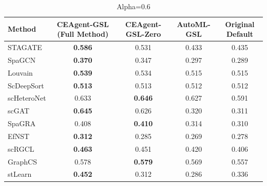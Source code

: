 \begin{table}[htbp]
\centering
\begin{tabular}{lcccc}
\toprule
Method & CEAgent-GSL (Full Method) & CEAgent-GSL-Zero & AutoML-GSL & Original Default \\
\midrule
STAGATE & \textbf{0.586} & 0.531 & 0.433 & 0.435 \\
SpaGCN & \textbf{0.370} & 0.347 & 0.297 & 0.289 \\
Louvain & \textbf{0.539} & 0.534 & 0.515 & 0.515 \\
ScDeepSort & \textbf{0.513} & 0.513 & 0.512 & 0.512 \\
scHeteroNet & 0.633 & \textbf{0.646} & 0.627 & 0.591 \\
scGAT & \textbf{0.645} & 0.626 & 0.320 & 0.311 \\
SpaGRA & 0.408 & \textbf{0.410} & 0.314 & 0.310 \\
EfNST & \textbf{0.312} & 0.285 & 0.269 & 0.278 \\
scRGCL & \textbf{0.463} & 0.451 & 0.420 & 0.406 \\
GraphCS & 0.578 & \textbf{0.579} & 0.569 & 0.557 \\
stLearn & \textbf{0.452} & 0.312 & 0.286 & 0.336 \\
\bottomrule
\end{tabular}
\caption{Alpha=0.6}
\label{tab:exp1}
\end{table}
